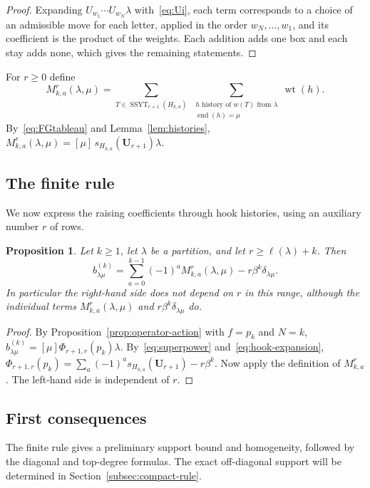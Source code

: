 \documentclass[11pt]{amsart}
\numberwithin{equation}{section}
\newtheorem{proposition}[theorem]{Proposition}
\theoremstyle{definition}
\theoremstyle{remark}
\newcommand{\SSYT}{\operatorname{SSYT}}
\newcommand{\wt}{\operatorname{wt}}
\newcommand{\enD}{\operatorname{end}}
\newcommand{\bfU}{\mathbf U}
\begin{document}
\begin{proof}
Expanding $U_{w_1}\cdots U_{w_N}\lambda$ with~\eqref{eq:Ui}, each term
corresponds to a choice of an admissible move for each letter, applied in
the order $w_N,\dots,w_1$, and its coefficient is the product of the
weights. Each addition adds one box and each stay adds none, which gives
the remaining statements.
\end{proof}

For $r\geq0$ define
\begin{equation}\label{eq:Mdef}
 M^r_{k,a}(\lambda,\mu)
 =\sum_{T\in\SSYT_{r+1}(H_{k,a})}\
 \sum_{\substack{h\text{ history of }w(T)\text{ from }\lambda\\ \enD(h)=\mu}}\wt(h).
\end{equation}
By~\eqref{eq:FGtableau} and Lemma~\ref{lem:histories},
$M^r_{k,a}(\lambda,\mu)=[\mu]\,s_{H_{k,a}}(\bfU_{r+1})\lambda$.

\subsection{The finite rule}

We now express the raising coefficients through hook histories, using an
auxiliary number $r$ of rows.

\begin{proposition}\label{prop:finite-rule}
Let $k\geq1$, let $\lambda$ be a partition, and let $r\geq\ell(\lambda)+k$.
Then
\begin{equation}\label{eq:finite-rule}
 b^{(k)}_{\lambda\mu}
 =\sum_{a=0}^{k-1}(-1)^aM^r_{k,a}(\lambda,\mu)-r\beta^k\delta_{\lambda\mu} .
\end{equation}
In particular the right-hand side does not depend on $r$ in this range,
although the individual terms $M^r_{k,a}(\lambda,\mu)$ and
$r\beta^k\delta_{\lambda\mu}$ do.
\end{proposition}

\begin{proof}
By Proposition~\ref{prop:operator-action} with $f=p_k$ and $N=k$,
$b^{(k)}_{\lambda\mu}=[\mu]\Phi_{r+1,r}(p_k)\lambda$. By~\eqref{eq:superpower}
and~\eqref{eq:hook-expansion},
$\Phi_{r+1,r}(p_k)=\sum_a(-1)^as_{H_{k,a}}(\bfU_{r+1})-r\beta^k$. Now apply
the definition of $M^r_{k,a}$. The left-hand side is independent of $r$.
\end{proof}

\subsection{First consequences}
The finite rule gives a preliminary support bound and
homogeneity, followed by the diagonal and top-degree formulas.
The exact off-diagonal support will be determined in
Section~\ref{subsec:compact-rule}.
\end{document}
